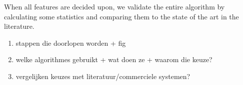 When all features are decided upon, we validate the entire algorithm by
calculating some statistics and comparing them to the state of the art in the
literature. %

\begin{enumerate}
\item stappen die doorlopen worden + fig
\item welke algorithmes gebruikt + wat doen ze + waarom die keuze?
\item vergelijken keuzes met literatuur/commerciele systemen?
\end{enumerate}